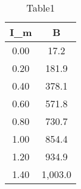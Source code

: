 \begin{table} 
 \caption{Table1}
\begin{tabular}{|*{2}{c|}}
\hline 
I_m & B\\ \hline 
0.00 & 17.2 \\ \hline 
 0.20 & 181.9 \\ \hline 
 0.40 & 378.1 \\ \hline 
 0.60 & 571.8 \\ \hline 
 0.80 & 730.7 \\ \hline 
 1.00 & 854.4 \\ \hline 
 1.20 & 934.9 \\ \hline 
 1.40 & 1,003.0 \\ \hline 
 \end{tabular} 
\end{table} 
